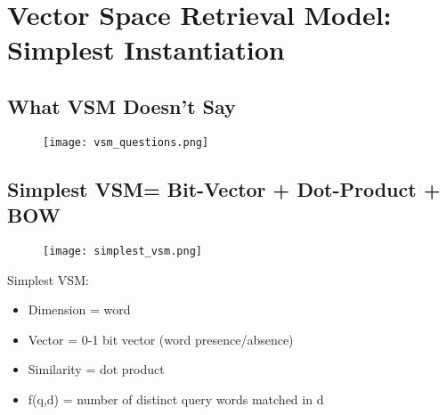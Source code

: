 \section{Vector Space Retrieval Model: Simplest Instantiation}

\subsection{What VSM Doesn’t Say}
\begin{figure}[H]
    \centering
    \texttt{[image: vsm\_questions.png]}
\end{figure}



\subsection{Simplest VSM= Bit-Vector + Dot-Product + BOW}
\begin{figure}[H]
    \centering
    \texttt{[image: simplest\_vsm.png]}
\end{figure}

Simplest VSM:
\begin{itemize}
\item Dimension = word
\item Vector = 0-1 bit vector (word presence/absence)
\item Similarity = dot product
\item f(q,d) = number of distinct query words matched in d
\end{itemize}
